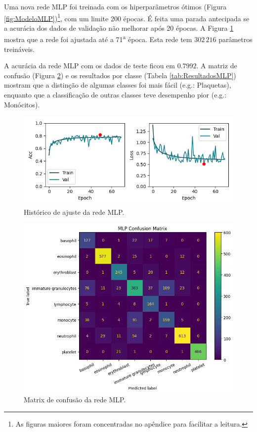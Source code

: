 \documentclass[final,5p]{elsarticle}
\numberwithin{equation}{section}
\begin{document}
     Uma nova rede MLP foi treinada com os hiperparâmetros ótimos (Figura \ref{fig:ModeloMLP})\footnote{As figuras maiores foram concentradas no apêndice para facilitar a leitura.}, com um limite 200 épocas. É feita uma parada antecipada se a acurácia dos dados de validação não melhorar após 20 épocas. A Figura \ref{fig:HistoricoMLP} mostra que a rede foi ajustada até a 71\textsuperscript{a} época. Esta rede tem $302\,216$ parâmetros treináveis.

     A acurácia da rede MLP com os dados de teste ficou em $0.7992$. A matriz de confusão (Figura \ref{fig:MatrizConfusaoMLP}) e os resultados por classe (Tabela \ref{tab:ResultadosMLP}) mostram que a distinção de algumas classes foi mais fácil (e.g.: Plaquetas), enquanto que a classificação de outras classes teve desempenho pior (e.g.: Monócitos).

    \begin{figure}[hbt!]
        \includegraphics[width=0.95\columnwidth]{MLP_history_cropped.png}
        \caption{Histórico de ajuste da rede MLP.}\label{fig:HistoricoMLP}
    \end{figure}

    \begin{figure}[hbt!]
        \includegraphics[width=0.95\columnwidth]{MLP_cm.png}
        \caption{Matrix de confusão da rede MLP.}\label{fig:MatrizConfusaoMLP}
    \end{figure}
\end{document}

